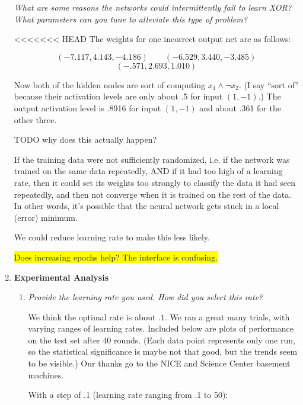 \documentclass{article}
\newcommand{\edit}[1]{\colorbox{Yellow}{#1}}
\begin{document}
\begin{enumerate}
    \textit{What are some reasons the networks could intermittently
      fail to learn XOR?  What parameters can you tune to alleviate
      this type of problem?}

<<<<<<< HEAD
    The weights for one incorrect output net are as follows:

    \[(-7.117, 4.143, -4.186)\qquad(-6.529, 3.440, -3.485)\]
    \[(-.571, 2.693, 1.010)\]

    Now both of the hidden nodes are sort of computing $x_1\wedge\lnot
    x_2$. (I say ``sort of'' because their activation levels are only
    about .5 for input $(1,-1)$.) The output activation level is .8916
    for input $(1,-1)$ and about .361 for the other three.

    TODO why does this actually happen?

    If the training data were not sufficiently randomized, i.e.  if
    the network was trained on the same data repeatedly, AND if it had
    too high of a learning rate, then it could set its weights too
    strongly to classify the data it had seen repeatedly, and then not
    converge when it is trained on the rest of the data. In other
    words, it's possible that the neural network gets stuck in a local
    (error) minimum.
      
    We could reduce learning rate to make this less likely. 

    \edit{Does increasing epochs help? The interface is confusing.}

  \item \textbf{Experimental Analysis}
    \begin{enumerate}
    \item \textit{Provide the learning rate you used. How did you
      select this rate?}

      We think the optimal rate is about $.1$. We ran a great many
      trials, with varying ranges of learning rates. Included below
      are plots of performance on the test set after 40 rounds. (Each
      data point represents only one run, so the statistical
      significance is maybe not that good, but the trends seem to be
      visible.) Our thanks go to the NICE and Science Center basement
      machines.


      With a step of .1 (learning rate ranging from .1 to 50):


\end{enumerate}
\end{enumerate}
\end{document}
